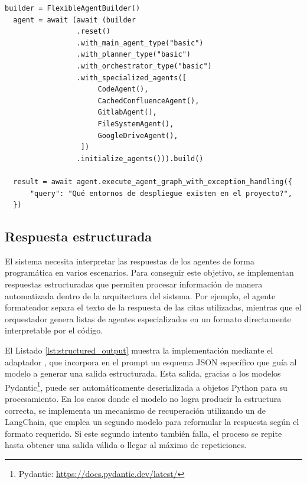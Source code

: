 \begin{lstlisting}[caption={Instanciación y ejecución del sistema mínimo con el patrón Builder},label={lst:builder}]
  builder = FlexibleAgentBuilder()
  agent = await (await (builder
                 .reset()
                 .with_main_agent_type("basic")
                 .with_planner_type("basic")
                 .with_orchestrator_type("basic")
                 .with_specialized_agents([
                      CodeAgent(),
                      CachedConfluenceAgent(),
                      GitlabAgent(),
                      FileSystemAgent(),
                      GoogleDriveAgent(),
                  ])
                 .initialize_agents())).build()

  result = await agent.execute_agent_graph_with_exception_handling({
      "query": "Qué entornos de despliegue existen en el proyecto?",
  })
\end{lstlisting}

\subsection{Respuesta estructurada}
El sistema necesita interpretar las respuestas de los agentes de forma programática en varios escenarios. Para conseguir este objetivo, se implementan respuestas estructuradas que permiten procesar información de manera automatizada dentro de la arquitectura del sistema. Por ejemplo, el agente formateador separa el texto de la respuesta de las citas utilizadas, mientras que el orquestador genera listas de agentes especializados en un formato directamente interpretable por el código.

El Listado \ref{lst:structured_output} muestra la implementación mediante el adaptador , que incorpora en el prompt un esquema JSON específico que guía al modelo a generar una salida estructurada. Esta salida, gracias a los modelos Pydantic\footnote{Pydantic: \url{https://docs.pydantic.dev/latest/}}, puede ser automáticamente deserializada a objetos Python para su procesamiento. En los casos donde el modelo no logra producir la estructura correcta, se implementa un mecanismo de recuperación utilizando un  de LangChain, que emplea un segundo modelo para reformular la respuesta según el formato requerido. Si este segundo intento también falla, el proceso se repite hasta obtener una salida válida o llegar al máximo de repeticiones.

